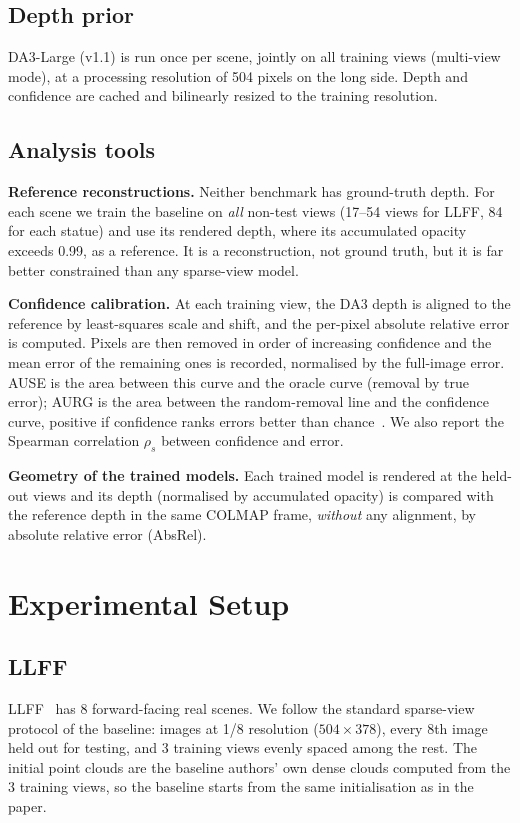 \subsection{Depth prior}
DA3-Large (v1.1) is run once per scene, jointly on all training views (multi-view mode), at a processing resolution of 504 pixels on the long side. Depth and confidence are cached and bilinearly resized to the training resolution.

\subsection{Analysis tools}
\textbf{Reference reconstructions.} Neither benchmark has ground-truth depth. For each scene we train the baseline on \emph{all} non-test views (17--54 views for LLFF, 84 for each statue) and use its rendered depth, where its accumulated opacity exceeds 0.99, as a reference. It is a reconstruction, not ground truth, but it is far better constrained than any sparse-view model.

\textbf{Confidence calibration.} At each training view, the DA3 depth is aligned to the reference by least-squares scale and shift, and the per-pixel absolute relative error is computed. Pixels are then removed in order of increasing confidence and the mean error of the remaining ones is recorded, normalised by the full-image error. AUSE is the area between this curve and the oracle curve (removal by true error); AURG is the area between the random-removal line and the confidence curve, positive if confidence ranks errors better than chance~\cite{poggi2020}. We also report the Spearman correlation $\rho_s$ between confidence and error.

\textbf{Geometry of the trained models.} Each trained model is rendered at the held-out views and its depth (normalised by accumulated opacity) is compared with the reference depth in the same COLMAP frame, \emph{without} any alignment, by absolute relative error (AbsRel).

\section{Experimental Setup}

\subsection{LLFF}
LLFF~\cite{llff} has 8 forward-facing real scenes. We follow the standard sparse-view protocol of the baseline: images at 1/8 resolution ($504\times378$), every 8th image held out for testing, and 3 training views evenly spaced among the rest. The initial point clouds are the baseline authors' own dense clouds computed from the 3 training views, so the baseline starts from the same initialisation as in the paper.

